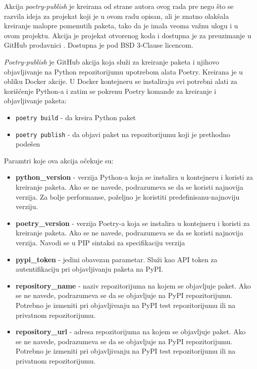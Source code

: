 \documentclass[12pt]{report}
\begin{document}
Akcija \textit{poetry-publish} je kreirana od strane autora ovog rada pre nego što se razvila ideja za projekat koji je u ovom radu opisan, ali je znatno olakšala kreiranje malopre pomenutih paketa, tako da je imala veoma važnu ulogu i u ovom projektu. Akcija je projekat otvorenog koda i dostupna je za preuzimanje u GitHub prodavnici \cite{poetry-publish-marketplace}. Dostupna je pod BSD 3-Clause licencom.

\textit{Poetry-publish} je GitHub akcija koja služi za kreiranje paketa i njihovo objavljivanje na Python repozitorijumu upotrebom alata Poetry. Kreirana je u obliku Docker akcije. U Docker kontejneru se instaliraju svi potrebni alati za korišćenje Python-a i zatim se pokrenu Poetry komande za kreiranje i objavljivanje paketa:

\begin{itemize}
    \item \texttt{poetry build} - da kreira Python paket
    \item \texttt{poetry publish} - da objavi paket na repozitorijumu koji je prethodno podešen
\end{itemize}

Paramtri koje ova akcija očekuje su:

\begin{itemize}
    \item \textbf{python\_version} - verzija Python-a koja se instalira u kontejneru i koristi za kreiranje paketa. Ako se ne navede, podrazumeva se da se koristi najnovija verzija. Za bolje performanse, poželjno je koristiti predefinisanu-najnoviju verziju.
    \item \textbf{poetry\_version} - verzija Poetry-a koja se instalira u kontejneru i koristi za kreiranje paketa. Ako se ne navede, podrazumeva se da se koristi najnovija verzija. Navodi se u PIP sintaksi za specifikaciju verzija
    \item \textbf{pypi\_token} - jedini obavezan parametar. Služi kao API token za autentifikaciju pri objavljivanju paketa na PyPI.
    \item \textbf{repository\_name} - naziv repozitorijuma na kojem se objavljuje paket. Ako se ne navede, podrazumeva se da se objavljuje na PyPI repozitorijumu. Potrebno je izmeniti pri objavljivanju na PyPI test repozitorijumu ili na privatnom repozitorijumu.
    \item \textbf{repository\_url} - adresa repozitorijuma na kojem se objavljuje paket. Ako se ne navede, podrazumeva se da se objavljuje na PyPI repozitorijumu. Potrebno je izmeniti pri objavljivanju na PyPI test repozitorijumu ili na privatnom repozitorijumu.
\end{itemize}
\end{document}
